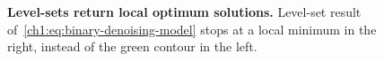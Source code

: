 \begin{figure}
\center
{}\hspace{3em}%
%
\caption{\textbf{Level-sets return local optimum solutions.} Level-set result of~\cref{ch1:eq:binary-denoising-model} stops at a local minimum in the right, instead of the green contour in the left.}
\label{ch1:fig:local-solution-level-set}
\end{figure}

